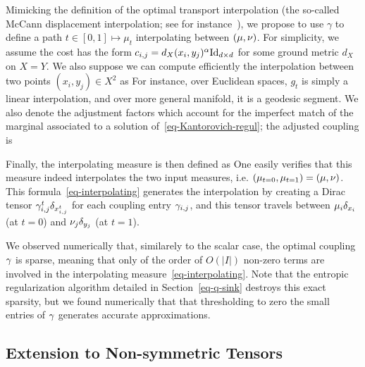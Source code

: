 Mimicking the definition of the optimal transport interpolation (the so-called McCann displacement interpolation; see for instance~\cite{santambrogio2015optimal}), we propose to use $\gamma$ to define a path $t \in [0,1] \mapsto \mu_t$ interpolating between $(\mu,\nu)$. 
%
For simplicity, we assume the cost has the form $c_{i,j}=d_X(x_i,y_j)^\alpha \mathrm{Id}_{d \times d}$ for some ground metric $d_X$ on $X=Y$. We also suppose we can compute efficiently the interpolation between two points $(x_i,y_j) \in X^2$ as
For instance, over Euclidean spaces, $g_t$ is simply a linear interpolation, and over more general manifold, it is a geodesic segment.
We also denote
the adjustment factors which account for the imperfect match of the marginal associated to a solution of~\eqref{eq-Kantorovich-regul}; the adjusted coupling is

Finally, the interpolating measure is then defined as
One easily verifies that this measure indeed interpolates the two input measures, i.e. 
$(\mu_{t=0},\mu_{t=1})=(\mu,\nu)$. 
%
This formula~\eqref{eq-interpolating} generates the interpolation by creating a Dirac tensor $ \gamma_{i,j}^t \delta_{x_{i,j}^t}$ for each coupling entry $\gamma_{i,j}$, and this tensor travels between $\mu_i \delta_{x_i}$ (at $t=0$) and $\nu_j \delta_{y_j}$ (at $t=1$).

\begin{rem} We observed numerically that, similarely to the scalar case, the optimal coupling $\gamma$ is sparse, meaning that only of the order of $O(|I|)$ non-zero terms are involved in the interpolating measure~\eqref{eq-interpolating}. Note that the entropic regularization algorithm detailed in Section~\ref{eq-q-sink} destroys this exact sparsity, but we found numerically that that thresholding to zero the small entries of $\gamma$ generates accurate approximations. 
\end{rem}


\subsection{Extension to Non-symmetric Tensors}


\fi
